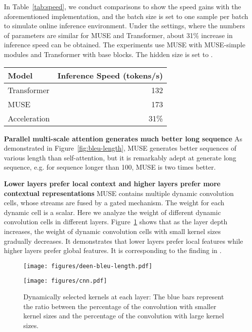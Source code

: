 \documentclass{article} \usepackage{iclr2020_conference,times}
\begin{document}
In Table~\ref{tab:speed}, we conduct comparisons to show the speed gains with the aforementioned implementation, and the batch size is set to one sample per batch to simulate online inference environment. Under the settings, where the numbers of parameters are similar for MUSE and Transformer, about 31\% increase in inference speed can be obtained. The experiments use MUSE with  MUSE-simple modules and Transformer with  base blocks. The hidden size is set to . 



\begin{table*}[ht]
\centering
\begin{tabular}{lr}
\toprule
Model  & Inference Speed (tokens/s) \\
\midrule
Transformer  &  132 \\
MUSE  & 173 \\ \midrule
Acceleration & 31\% \\
\bottomrule
\end{tabular}
\caption{The comparison between the inference speed  of  MUSE and Transformer.}
\label{tab:speed}
\end{table*}

\textbf{Parallel multi-scale attention generates  much better long sequence}
As demonstrated in Figure~\ref{fig:bleu-length}, MUSE generates better  sequences of various length than self-attention, but it is remarkably adept at generate long sequence, e.g. for sequence longer than 100, MUSE is two times better.

\textbf{Lower layers prefer local context and higher layers prefer more contextual representations}
MUSE contains multiple dynamic convolution cells, whose streams are fused by a gated mechanism. The weight for each dynamic cell is a scalar. Here we analyze the weight of different dynamic convolution cells in different layers.  
Figure~\ref{fig:layer-k} shows that as the layer depth increases, the weight of dynamic convolution cells with small kernel sizes gradually decreases. It demonstrates that lower layers prefer local features while higher layers prefer global features. It is corresponding to the finding in \citet{ramach2019standalone}.



\begin{figure}[ht]
\centering
\begin{minipage}[]{0.46\linewidth}  
\texttt{[image: figures/deen-bleu-length.pdf]}
\caption{BLEU scores of models on different groups with different source sentence lengths. The experiments are conducted on the De-En dataset. MUSE performs better than Transformer, especially on long sentences.}
\label{fig:bleu-length}
\end{minipage}
\qquad
\begin{minipage}[]{0.46\linewidth} 
\texttt{[image: figures/cnn.pdf]}
\caption{Dynamically selected kernels at each layer: The blue bars represent the ratio between the percentage of the  convolution with  smaller kernel sizes and the percentage of the convolution with large kernel sizes.}
\label{fig:layer-k}
\end{minipage}
\end{figure}
\end{document}
